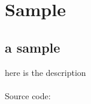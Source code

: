 %
%
	\newpage
	\section{Sample}
	\subsection{a sample}
	here is the description\\
	~\\
	Source code:\\
	
%	
%